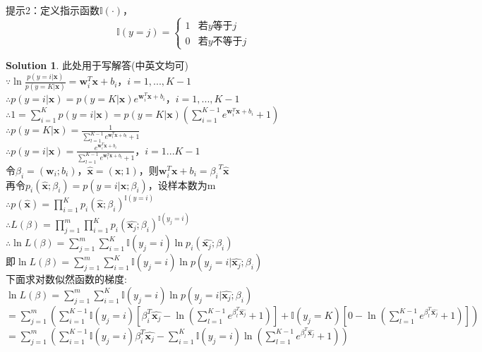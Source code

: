\documentclass[a4paper,UTF8]{article}
\numberwithin{equation}{section}
\theoremstyle{definition}
\newtheorem*{solution}{Solution}
\begin{document}
提示2：定义指示函数$\mathbb{I}(\cdot)$，
$$\mathbb{I}(y=j)=
\begin{cases}
1& \text{若$y$等于$j$}\\
0& \text{若$y$不等于$j$}
\end{cases}$$

\begin{solution}
此处用于写解答(中英文均可)\\
$\because \ln\frac{p(y=i|\mathbf x)}{p(y=K|\mathbf x)}=\mathbf w^T_i \mathbf x + b_i$，$i=1,...,K-1$\\
$\therefore p(y=i|\mathbf x)=p(y=K|\mathbf x) e^{\mathbf w^T_i \mathbf x + b_i}$，$i=1,...,K-1$\\
$\therefore 1=\sum_{i=1}^{K}p(y=i|\mathbf x) = p(y=K|\mathbf x)(\sum_{i=1}^{K-1} e^{\mathbf w^T_i \mathbf x + b_i} + 1)$\\
$\therefore p(y=K|\mathbf x) = \frac{1}{\sum_{l=1}^{K-1} e^{\mathbf w^T_l \mathbf x + b_l} + 1}$\\
$\therefore p(y=i|\mathbf x) = \frac{e^{\mathbf w^T_i \mathbf x + b_i}}{\sum_{l=1}^{K-1} e^{\mathbf w^T_l \mathbf x + b_l} + 1}$，$i=1...K-1$\\
令$\beta_i = (\mathbf w_i;b_i)$，$\hat{\mathbf x}=(\mathbf x;1)$，则$\mathbf w_i^T \mathbf x + b_i = {\beta_i}^T\hat{\mathbf x}$\\
再令$p_i(\hat{\mathbf x};\beta_i)=p(y=i|\hat{\mathbf x};\beta_i)$，设样本数为m\\
$\therefore p(\hat{\mathbf x})=\prod_{i=1}^{K} p_i(\hat{\mathbf x};\beta_i)^{\mathbb{I}(y=i)}$\\
$\therefore L(\beta)=\prod_{j=1}^{m}\prod_{i=1}^{K} p_i(\hat{\mathbf x_j};\beta_i)^{\mathbb{I}(y_j=i)}$\\
$\therefore \ln{L(\beta)} = \sum_{j=1}^m \sum_{i=1}^{K} \mathbb{I}(y_j=i) \ln{p_i(\hat{\mathbf x_j}; \beta_i)}$\\
即$\ln{L(\beta)} = \sum_{j=1}^m \sum_{i=1}^{K} \mathbb{I}(y_j=i) \ln{p(y_j=i|\hat{\mathbf x_j};\beta_i)}$\\
下面求对数似然函数的梯度:\\
$\ln{L(\beta)} = \sum_{j=1}^m \sum_{i=1}^{K} \mathbb{I}(y_j=i) \ln{p(y_j=i|\hat{\mathbf x_j};\beta_i)}$\\
$=\sum_{j=1}^m (\sum_{i=1}^{K-1}\mathbb{I}(y_j=i) [\beta^T_i \hat{\mathbf x_j} - \ln(\sum_{l=1}^{K-1}e^{\beta^T_l \hat{\mathbf x_j}} + 1)] + \mathbb{I}(y_j=K)[0-\ln(\sum_{l=1}^{K-1} e^{\beta^T_l \hat{\mathbf x_j}} + 1)])$\\
$=\sum_{j=1}^m (\sum_{i=1}^{K-1}\mathbb{I}(y_j=i)\beta^T_i \hat{\mathbf x_j} - \sum_{i=1}^{K}\mathbb{I}(y_j=i)\ln(\sum_{l=1}^{K-1} e^{\beta^T_l \hat{\mathbf x_j}} + 1))$\\

\end{solution}
\end{document}
